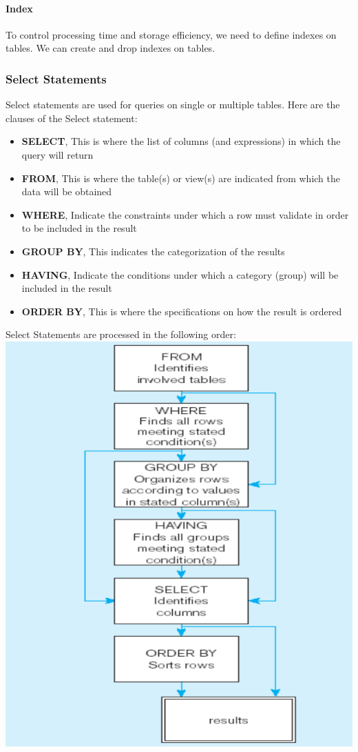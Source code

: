 \documentclass[12pt]{article}
\begin{document}
\paragraph{Index} To control processing time and storage efficiency, we need to define indexes on tables. We can create and drop indexes on tables.

\subsubsection{Select Statements}

Select statements are used for queries on single or multiple tables. Here are the clauses of the Select statement:
\begin{itemize}
	\item{\textbf{SELECT}, This is where the list of columns (and expressions) in which the query will return}
	\item{\textbf{FROM}, This is where the table(s) or view(s) are indicated from which the data will be obtained}
	\item{\textbf{WHERE}, Indicate the constraints under which a row must validate in order to be included in the result}
	\item{\textbf{GROUP BY}, This indicates the categorization of the results}
	\item{\textbf{HAVING}, Indicate the conditions under which a category (group) will be included in the result}
	\item{\textbf{ORDER BY}, This is where the specifications on how the result is ordered}
\end{itemize}

Select Statements are processed in the following order:\\
\includegraphics[scale=1]{lec8-1}
\end{document}
